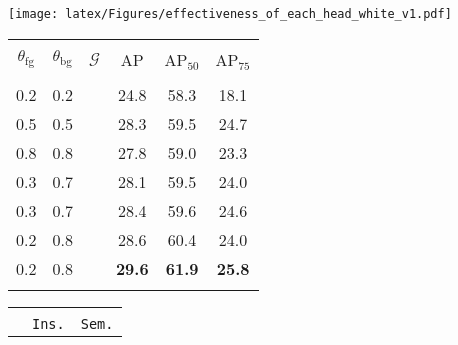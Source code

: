 \documentclass[final]{cvpr}
\newcommand{\xmark}{\text{\ding{55}}}
\newcommand{\cmark}{\text{\ding{51}}}
\begin{document}
\begin{table*}[t]
  \centering
\begin{minipage}{0.28\linewidth}
  \centering
  \texttt{[image: latex/Figures/effectiveness\_of\_each\_head\_white\_v1.pdf]}
  \vspace{-1.7em}
  \end{minipage}\hfill
\begin{minipage}{0.34\linewidth}
\center
{
\begin{tabular}{c@{\hskip 0.15in}c@{\hskip 0.15in}c@{\hskip 0.2in}c@{\hskip 0.13in}c@{\hskip 0.09in}c}
     \Xhline{1pt}\\[-0.95em]
    $\theta_{\text{fg}}$    & $\theta_{\text{bg}}$ & $\mathcal{G}$ & AP   & AP$_{50}$  & AP$_{75}$ \\
    \hline\hline
    \\[-0.9em]
    0.2&0.2      &   \xmark    & 24.8      &  58.3     & 18.1  \\
    0.5&0.5  &   \xmark    &  28.3     &  59.5     &  24.7 \\

  0.8&0.8  &   \xmark    &  27.8     & 59.0      &  23.3 \\
    0.3   & 0.7   &    \xmark   &    28.1   &  59.5     & 24.0 \\
    0.3   & 0.7   &   \textcolor{red}{\cmark}    &  28.4   &    59.6  &  24.6  \\
    0.2   & 0.8   &    \xmark   &   28.6    &   60.4    & 24.0 \\
    0.2   & 0.8   &   \textcolor{red}{\cmark}    &  \textbf{29.6}     &  \textbf{61.9}     & \textbf{25.8} \\
    \Xhline{1pt}
    \end{tabular}}
    \vspace{-0.7em}
      \caption{Analysis of thresholds $\theta_{\text{fg}}$ and $\theta_{\text{bg}}$, and effect of the growing technique $\mathcal{G}$.}
  \label{table_params}\end{minipage}\hfill
\begin{minipage}{0.32\linewidth}
\centering
{
    \begin{tabular}{c@{\hskip 0.17in}c@{\hskip 0.13in}c@{\hskip 0.1in}c@{\hskip 0.1in}c}
    \Xhline{1pt}\\[-0.95em]
               & \multicolumn{3}{c}{\texttt{Ins.}} & \texttt{Sem.} \\
    

\end{tabular}}
\end{minipage}
\end{table*}
\end{document}

